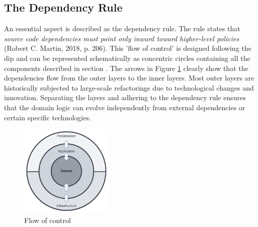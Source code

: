 \subsection{The Dependency Rule} \label{subsec_dependency_rule}

An essential aspect is described as the dependency rule. The rule states that
\textit{source code dependencies must point only inward toward higher-level policies}
(Robert C. Martin, 2018, p. 206). This ’flow of control’ is designed following the
\gls{dip} and can be represented schematically as concentric circles containing all the
components described in section . The arrows in Figure
\ref{fig_modulair_components} clearly show that the dependencies flow from the outer
layers to the inner layers. Most outer layers are historically subjected to large-scale
refactorings due to technological changes and innovation. Separating the layers and adhering
to the dependency rule ensures that the domain logic can evolve independently from
external dependencies or certain specific technologies.

\begin{figure}[H]
    \centering
    \includegraphics[width=0.4\textwidth]{figures/ca_diagram.pdf}
    \caption[Flow of control]{Flow of control}
    \label{fig_modulair_components}
\end{figure}